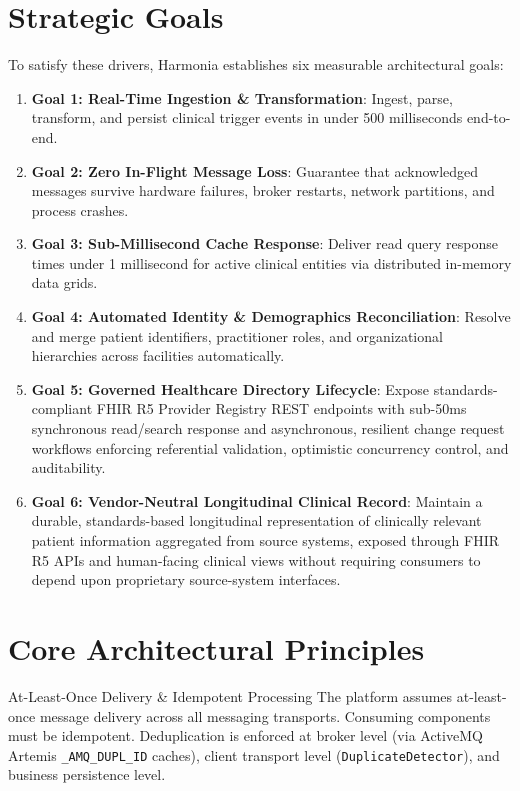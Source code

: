 \section{Strategic Goals}

To satisfy these drivers, Harmonia establishes six measurable architectural goals:

\begin{enumerate}
    \item \textbf{Goal 1: Real-Time Ingestion \& Transformation}: Ingest, parse, transform, and persist clinical trigger events in under 500 milliseconds end-to-end.

    \item \textbf{Goal 2: Zero In-Flight Message Loss}: Guarantee that acknowledged messages survive hardware failures, broker restarts, network partitions, and process crashes.

    \item \textbf{Goal 3: Sub-Millisecond Cache Response}: Deliver read query response times under 1 millisecond for active clinical entities via distributed in-memory data grids.

    \item \textbf{Goal 4: Automated Identity \& Demographics Reconciliation}: Resolve and merge patient identifiers, practitioner roles, and organizational hierarchies across facilities automatically.

    \item \textbf{Goal 5: Governed Healthcare Directory Lifecycle}: Expose standards-compliant FHIR R5 Provider Registry REST endpoints with sub-50ms synchronous read/search response and asynchronous, resilient change request workflows enforcing referential validation, optimistic concurrency control, and auditability.

    \item \textbf{Goal 6: Vendor-Neutral Longitudinal Clinical Record}: Maintain a durable, standards-based longitudinal representation of clinically relevant patient information aggregated from source systems, exposed through FHIR R5 APIs and human-facing clinical views without requiring consumers to depend upon proprietary source-system interfaces.
\end{enumerate}

\section{Core Architectural Principles}

\begin{principlebox}{At-Least-Once Delivery \& Idempotent Processing}
The platform assumes at-least-once message delivery across all messaging transports. Consuming components must be idempotent. Deduplication is enforced at broker level (via ActiveMQ Artemis \texttt{\_AMQ\_DUPL\_ID} caches), client transport level (\texttt{DuplicateDetector}), and business persistence level.
\end{principlebox}

